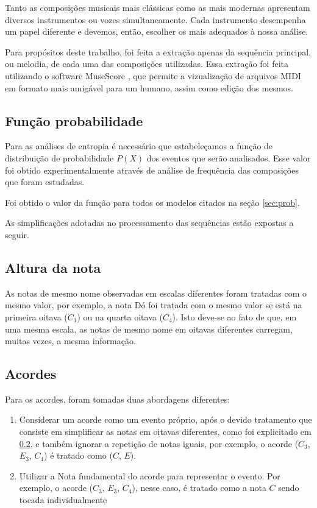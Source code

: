 Tanto as composições musicais mais clássicas como as mais modernas apresentam diversos instrumentos ou vozes simultaneamente. Cada instrumento desempenha um papel diferente e devemos, então, escolher os mais adequados à nossa análise.

Para propósitos deste trabalho, foi feita a extração apenas da sequência principal, ou melodia, de cada uma das composições utilizadas. Essa extração foi feita utilizando o software MuseScore \cite{musescore}, que permite a vizualização de arquivos MIDI em formato mais amigável para um humano, assim como edição dos mesmos.


\subsection{Função probabilidade}

Para as análises de entropia é necessário que estabeleçamos a função de distribuição de probabilidade $P(X)$ dos eventos que serão analisados. Esse valor foi obtido experimentalmente através de análise de frequência das composições que foram estudadas.

Foi obtido o valor da função para todos os modelos citados na seção \ref{sec:prob}.

As simplificações adotadas no processamento das sequências estão expostas a seguir.

\subsection{Altura da nota}\label{section:altura_da_nota}

As notas de mesmo nome observadas em escalas diferentes foram tratadas com o mesmo valor, por exemplo, a nota Dó foi tratada com o mesmo valor se está na primeira oitava ($C_1$) ou na quarta oitava ($C_4$). Isto deve-se ao fato de que, em uma mesma escala, as notas de mesmo nome em oitavas diferentes carregam, muitas vezes, a mesma informação.

\subsection{Acordes}

Para os acordes, foram tomadas duas abordagens diferentes:

\begin{enumerate}
    \item Considerar um acorde como um evento próprio, após o devido tratamento que consiste em simplificar as notas em oitavas diferentes, como foi explicitado em \ref{section:altura_da_nota}, e também ignorar a repetição de notas iguais, por exemplo, o acorde ($C_3$, $E_3$, $C_4$) é tratado como ($C$, $E$).

    \item Utilizar a Nota fundamental do acorde para representar o evento. Por exemplo, o acorde ($C_3$, $E_3$, $C_4$), nesse caso, é tratado como a nota $C$ sendo tocada individualmente
\end{enumerate}

